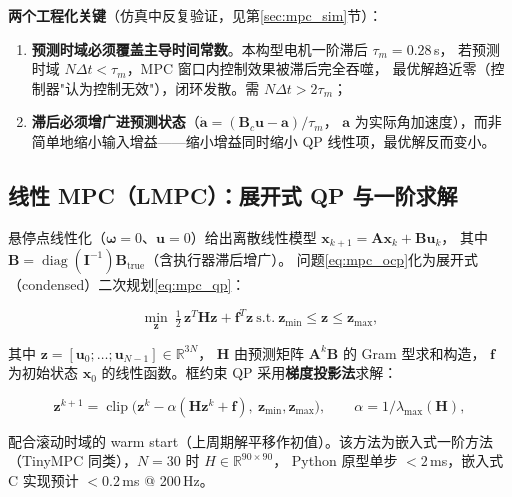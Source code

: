 \textbf{两个工程化关键}（仿真中反复验证，见第\ref{sec:mpc_sim}节）：
\begin{enumerate}
    \item \textbf{预测时域必须覆盖主导时间常数}。本构型电机一阶滞后 $\tau_m=0.28$\,s，
          若预测时域 $N\Delta t < \tau_m$，MPC 窗口内控制效果被滞后完全吞噬，
          最优解趋近零（控制器"认为控制无效"），闭环发散。需 $N\Delta t > 2\tau_m$；
    \item \textbf{滞后必须增广进预测状态}（$\dot{\boldsymbol{a}} = (\mathbf{B}_c\mathbf{u}-\boldsymbol{a})/\tau_m$，
          $\boldsymbol{a}$ 为实际角加速度），而非简单地缩小输入增益——缩小增益同时缩小
          QP 线性项，最优解反而变小。
\end{enumerate}

\subsection{线性 MPC（LMPC）：展开式 QP 与一阶求解}
\label{sec:lmpc}

悬停点线性化（$\boldsymbol{\omega}=0$、$\mathbf{u}=0$）给出离散线性模型
$\mathbf{x}_{k+1} = \mathbf{A}\mathbf{x}_k + \mathbf{B}\mathbf{u}_k$，
其中 $\mathbf{B} = \operatorname{diag}(\mathbf{I}^{-1})\mathbf{B}_{\mathrm{true}}$（含执行器滞后增广）。
问题\eqref{eq:mpc_ocp}化为展开式（condensed）二次规划\eqref{eq:mpc_qp}：

\begin{equation}
    \min_{\mathbf{z}}\ \tfrac{1}{2}\,\mathbf{z}^T\mathbf{H}\mathbf{z} + \mathbf{f}^T\mathbf{z}
    \ \text{s.t.}\ \mathbf{z}_{\min}\le\mathbf{z}\le\mathbf{z}_{\max},
    \label{eq:mpc_qp}
\end{equation}

其中 $\mathbf{z}=[\mathbf{u}_0;\dots;\mathbf{u}_{N-1}]\in\mathbb{R}^{3N}$，
$\mathbf{H}$ 由预测矩阵 $\mathbf{A}^k\mathbf{B}$ 的 Gram 型求和构造，
$\mathbf{f}$ 为初始状态 $\mathbf{x}_0$ 的线性函数。框约束 QP 采用\textbf{梯度投影法}求解：

\begin{equation}
    \mathbf{z}^{k+1} = \operatorname{clip}\!\big(\mathbf{z}^{k} - \alpha(\mathbf{H}\mathbf{z}^k+\mathbf{f}),\ \mathbf{z}_{\min},\mathbf{z}_{\max}\big),
    \qquad \alpha = 1/\lambda_{\max}(\mathbf{H}),
    \label{eq:pgd}
\end{equation}

配合滚动时域的 warm start（上周期解平移作初值）。该方法为嵌入式一阶方法
（TinyMPC\cite{cassel2024tinympc} 同类），$N=30$ 时 $H\in\mathbb{R}^{90\times90}$，
Python 原型单步 $<2$\,ms，嵌入式 C 实现预计 $<0.2$\,ms @ 200\,Hz。

